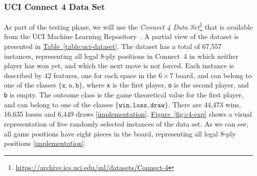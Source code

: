 \documentclass{article}
\newcommand{\GithubURL}[1]{[\href{https://github.com/davidrobles/mlnd-capstone-code/blob/master/#1}{implementation}]}
\newcommand{\URLUCI}{\url{https://archive.ics.uci.edu/ml/datasets/Connect-4}}
\begin{document}
\subsubsection{UCI Connect 4 Data Set}
\label{sec:uci-c4}

As part of the testing phase, we will use the \emph{Connect 4 Data Set}\footnote{\URLUCI{}} that is
available from the UCI Machine Learning Repository~\citep{Hettich1998UCI}. A partial view of the
dataset is presented in \hyperref[table:uci-dataset]{Table~\ref*{table:uci-dataset}}. The dataset
has a total of 67,557 instances, representing all legal 8-ply positions in \mbox{Connect 4} in which
neither player has won yet, and which the next move is not forced. Each instance is described by 42
features, one for each space in the $6 \times 7$ board, and can belong to one of the classes
$\{\texttt{x}, \texttt{o}, \texttt{b}\}$, where \texttt{x} is the first player, \texttt{o} is the
second player, and \texttt{b} is empty. The outcome class is the game theoretical value for the
first player, and can belong to one of the classes $\{\texttt{win}, \texttt{loss}, \texttt{draw}\}$.
There are 44,473 wins, 16,635 losses and 6,449 draws \GithubURL{experiments/c4_uci_data_expl.py}.
\hyperref[fig:c4-exp]{Figure~\ref*{fig:c4-exp}} shows a visual representation of five randomly
selected instances of the data set. As we can see, all game positions have eight pieces in the
board, representing all legal 8-ply positions \GithubURL{experiments/c4_uci_viz.py}.

\end{document}
